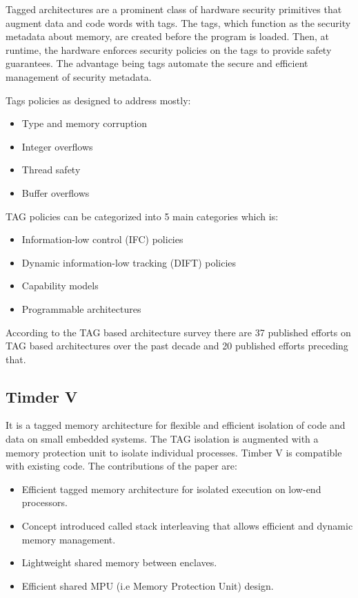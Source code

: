 Tagged architectures are a prominent class of hardware security primitives that augment data and code words
with tags. The tags, which function as the security metadata
about memory, are created before the program is loaded. 
Then, at runtime, the hardware enforces security policies on the tags to provide safety guarantees. 
The advantage being tags automate the secure and efficient management of security metadata. 

Tags policies as designed to address mostly:
\begin{itemize}
  \item Type and memory corruption
  \item Integer overflows
  \item Thread safety
  \item Buffer overflows
\end{itemize}

TAG policies can be categorized into 5 main categories which is:
\begin{itemize}
  \item Information-low control (IFC) policies
  \item Dynamic information-low tracking (DIFT) policies
  \item Capability models
  \item Programmable architectures
\end{itemize}
 
According to the TAG based architecture survey \cite{acmTAGSurvey} there are 37 published
efforts on TAG based architectures over the past decade and 20 published efforts preceding that. 

\subsection{Timder V \cite{weiser_timber-v_2019}}
 It is a tagged memory architecture for flexible and efficient isolation of code and data on 
 small embedded systems. The TAG isolation is augmented with a memory protection unit to isolate 
 individual processes. Timber V is compatible with existing code. The contributions of the paper 
 are: 
 \begin{itemize}
  \item Efficient tagged memory architecture for isolated execution on low-end processors. 
  \item Concept introduced called stack interleaving that allows efficient and dynamic memory management. 
  \item Lightweight shared memory between enclaves. 
  \item Efficient shared MPU (i.e Memory Protection Unit) design. 
 \end{itemize}

